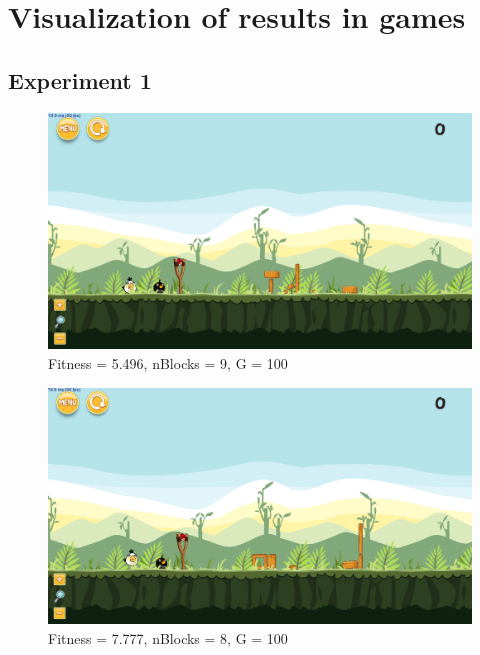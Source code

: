 \section{Visualization of results in games}

\subsection{Experiment 1}\label{a:e1}

\begin{figure}[H]
	\centering
	\includegraphics[scale=0.35]{gfx/e1/level-0-180522_171359.png}
	\caption{Fitness = 5.496, nBlocks = 9, G = 100 }\label{f:e1-1}
\end{figure}

\begin{figure}[H]
	\centering
	\includegraphics[scale=0.35]{gfx/e1/level-0-180522_183913.png}
	\caption{Fitness = 7.777, nBlocks = 8, G = 100 }\label{f:e1-2}
\end{figure}

